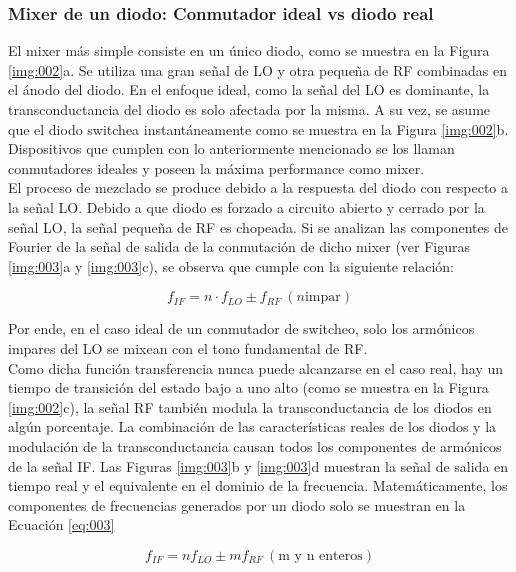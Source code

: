 \documentclass[a4paper,10pt]{article}
\begin{document}
	\subsubsection{Mixer de un diodo: Conmutador ideal vs diodo real}
	\indent El mixer más simple consiste en un único diodo, como se muestra en 
	la Figura \ref{img:002}a. Se utiliza una gran señal de LO y otra pequeña de 
	RF combinadas en el ánodo del diodo. En el enfoque ideal, como la señal del 
	LO es dominante, la transconductancia del diodo es solo afectada por la 
	misma. A su vez, se asume que el diodo switchea instantáneamente como se 
	muestra en la Figura \ref{img:002}b. Dispositivos que cumplen con lo 
	anteriormente mencionado se los llaman conmutadores ideales y poseen la 
	máxima performance como mixer. \\
	\indent El proceso de mezclado se produce debido a la respuesta del diodo 
	con respecto a la señal LO. Debido a que diodo es forzado a circuito abierto 
	y cerrado por la señal LO, la señal pequeña de RF es chopeada. Si se 
	analizan las componentes de Fourier de la señal de salida de la conmutación 
	de dicho mixer (ver Figuras \ref{img:003}a y \ref{img:003}c), se observa que
	cumple con la siguiente relación:

	\begin{equation*}
		f_{IF} = n\cdot f_{LO}\pm f_{RF}~(n\text{impar})
	\end{equation*}

	\indent Por ende, en el caso ideal de un conmutador de switcheo, solo los 
	armónicos impares del LO se mixean con el tono fundamental de RF. \\
	\indent Como dicha función transferencia nunca puede alcanzarse en el caso 
	real, hay un tiempo de transición del estado bajo a uno alto (como se 
	muestra en la Figura \ref{img:002}c), la señal RF tambi\'en modula la 
	transconductancia de los diodos en algún porcentaje. La combinación de las 
	características reales de los diodos y la modulación de la transconductancia
	causan todos los componentes de armónicos de la señal IF. Las Figuras 
	\ref{img:003}b y \ref{img:003}d muestran la señal de salida en tiempo real y
	el equivalente en el dominio de la frecuencia. Matemáticamente, los 
	componentes de frecuencias generados por un diodo solo se muestran en la 
	Ecuación \ref{eq:003}

	\begin{equation}\label{eq:003}
 		f_{IF} = n f_{LO}\pm m f_{RF}~(\text{m y n enteros})
	\end{equation}
\end{document}

